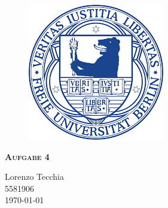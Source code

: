 \documentclass{report}
\begin{document}
\begin{center}
    
\end{center}
    \begin{figure}[htb]
            \centering\includegraphics[width=.5\textwidth]{Immagini/FUlogo.png}
    \end{figure}
    

 {\centering\scshape\LARGE\bfseries Aufgabe 4
    \begin{center}
        Lorenzo Tecchia \\ 5581906  \\ \today
    \end{center}}


    \newpage
    
    \tableofcontents
    \listoffigures
    \listoftables
    
    
    
    

    
    
    \printbibliography
    
\end{document}

